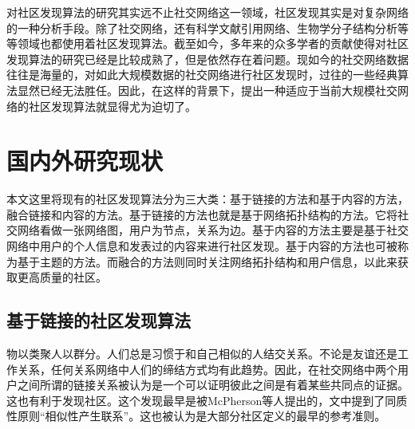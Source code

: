 对社区发现算法的研究其实远不止社交网络这一领域，社区发现其实是对复杂网络的一种分析手段。除了社交网络，还有科学文献引用网络、生物学分子结构分析等等领域也都使用着社区发现算法。截至如今，多年来的众多学者的贡献使得对社区发现算法的研究已经是比较成熟了，但是依然存在着问题。现如今的社交网络数据往往是海量的，对如此大规模数据的社交网络进行社区发现时，过往的一些经典算法显然已经无法胜任。因此，在这样的背景下，提出一种适应于当前大规模社交网络的社区发现算法就显得尤为迫切了。

\section{国内外研究现状}

本文这里将现有的社区发现算法分为三大类：基于链接的方法和基于内容的方法，融合链接和内容的方法。基于链接的方法也就是基于网络拓扑结构的方法。它将社交网络看做一张网络图，用户为节点，关系为边。基于内容的方法主要是基于社交网络中用户的个人信息和发表过的内容来进行社区发现。基于内容的方法也可被称为基于主题的方法。而融合的方法则同时关注网络拓扑结构和用户信息，以此来获取更高质量的社区。

\subsection{基于链接的社区发现算法}

物以类聚人以群分。人们总是习惯于和自己相似的人结交关系。不论是友谊还是工作关系，任何关系网络中人们的缔结方式均有此趋势。因此，在社交网络中两个用户之间所谓的链接关系被认为是一个可以证明彼此之间是有着某些共同点的证据。这也有利于发现社区。这个发现最早是被McPherson等人\cite{Mcpherson2001Birds}提出的，文中提到了同质性原则“相似性产生联系”。这也被认为是大部分社区定义的最早的参考准则。


